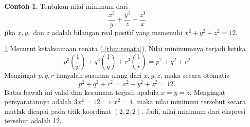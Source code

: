 \documentclass[aspectratio=169]{beamer}
\theoremstyle{definition}
\newtheorem{contoh}{Contoh}
\newcommand{\myref}[1]{\hyperref[#1]{\nameCref{#1} \ref*{#1}}}
\begin{document}
\begin{frame}{\insertsection}{\insertsubsection}
  \begin{contoh}
    Tentukan nilai minimum dari\label{cth:renata}
    \[
      \frac{x^3}{y} + \frac{y^3}{z} + \frac{z^3}{x}
    \]
    jika $x, y,$ dan $z$ adalah bilangan real positif yang memenuhi $x^2 + y^2 + z^2 = 12$.

  \end{contoh}
\end{frame}
\begin{frame}{\insertsection}{\insertsubsection}
  \begin{exampleblock}{\myref{cth:renata}}
    Menurut ketaksamaan renata (\myref{thm:renata}), Nilai minimumnya terjadi ketika
    \[ p^3\left(\frac{1}{p}\right) + q^3\left(\frac{1}{q}\right) + r^3\left(\frac{1}{r}\right) = p^2 + q^2 + r^2 \]
    Mengingat $p, q, r$ hanyalah susunan ulang dari $x, y, z$, maka secara otomatis
    \[p^2 + q^2 + r^2 = x^2 + y^2 + z^2 =12.\]
    Batas bawah ini valid dan kesamaan terjadi apabila $x = y = z$. Mengingat persyaratannya adalah $3x^2 = 12 \implies x^2 = 4$, maka nilai minimum tersebut secara mutlak dicapai pada titik koordinat $(2, 2, 2)$. Jadi, nilai minimum dari ekspresi tersebut adalah 12.
  \end{exampleblock}
\end{frame}
\end{document}
